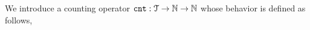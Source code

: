   We introduce a counting operator $\mathtt{cnt} : \mathcal{T} \to \mathbb{N} \to \mathbb{N}$ whose behavior is defined as follows,

